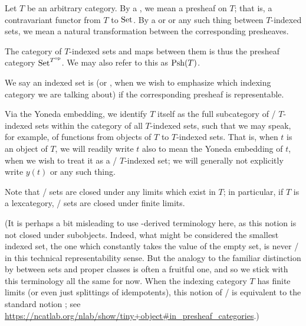 Let $T$ be an arbitrary category. By a , we mean a presheaf on $T$; that is, a contravariant functor from $T$ to $\mathrm{Set}$. By a  or  or any such thing between $T$-indexed sets, we mean a natural transformation between the corresponding presheaves.

The category of $T$-indexed sets and maps between them is thus the presheaf category $\mathrm{Set}^{T^{\mathrm{op}}}$. We may also refer to this as $\operatorname{Psh}(T)$. 

We say an indexed set is  (or , when we wish to emphasize which indexing category we are talking about) if the corresponding presheaf is representable. 

Via the Yoneda embedding, we identify $T$ itself as the full subcategory of \repsmall/ $T$-indexed sets within the category of all $T$-indexed sets, such that we may speak, for example, of functions from objects of $T$ to $T$-indexed sets. That is, when $t$ is an object of $T$, we will readily write $t$ also to mean the Yoneda embedding of $t$, when we wish to treat it as a \repsmall/ $T$-indexed set; we will generally not explicitly write $y(t)$ or any such thing.

Note that \repsmall/ sets are closed under any limits which exist in $T$; in particular, if $T$ is a lexcategory, \repsmall/ sets are closed under finite limits.

(It is perhaps a bit misleading to use -derived terminology here, as this notion is not closed under subobjects. Indeed, what might be considered the smallest indexed set, the one which constantly takes the value of the empty set, is never \repsmall/ in this technical representability sense. But the analogy to the familiar distinction by between  sets and proper classes is often a fruitful one, and so we stick with this terminology all the same for now. When the indexing category $T$ has finite limits (or even just splittings of idempotents), this notion of \repsmall/ is equivalent to the standard notion ; see \url{https://ncatlab.org/nlab/show/tiny+object#in_presheaf_categories}.)

